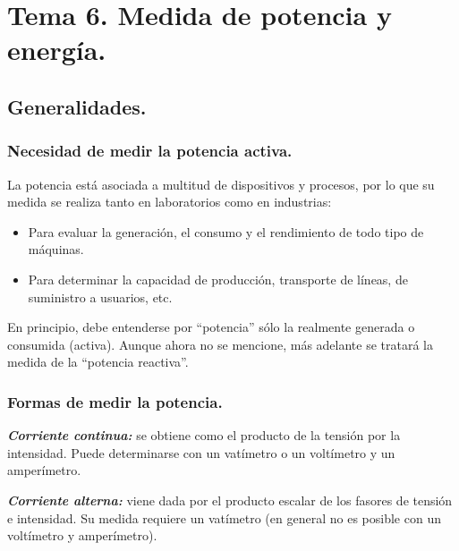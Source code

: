 \section{Tema 6. Medida de potencia y energía.}
	\subsection{Generalidades.}
		\subsubsection{Necesidad de medir la potencia activa.}
			La potencia está asociada a multitud de dispositivos y procesos, por lo que su medida se realiza tanto en laboratorios como en industrias:
			\begin{itemize}
				\item Para evaluar la generación, el consumo y el rendimiento de todo tipo de máquinas.
				\item Para determinar la capacidad de producción, transporte de líneas, de suministro a usuarios, etc.
			\end{itemize}
			
			En principio, debe entenderse por “potencia” sólo la realmente generada o consumida (activa). Aunque ahora no se mencione, más adelante se tratará la medida de la “potencia reactiva”.
		
		\subsubsection{Formas de medir la potencia.}
		\textbf{\textit{Corriente continua:}} se obtiene como el producto de la tensión por la intensidad. Puede determinarse con un vatímetro o un voltímetro y un amperímetro.
		
		
		\textbf{\textit{Corriente alterna:}} viene dada por el producto escalar de los fasores de tensión e intensidad. Su medida requiere un vatímetro (en general no es posible con un voltímetro y amperímetro).
		
